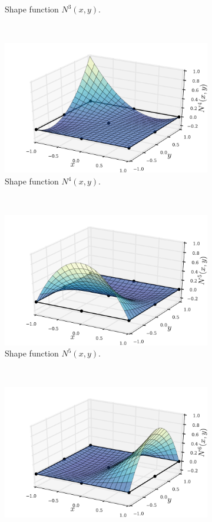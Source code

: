 \begin{figure}[H]
\begin{subfigure}[b]{0.45\textwidth}
		\caption{Shape function $N^3(x,y)$.}
	\end{subfigure}\,
%
	\begin{subfigure}[b]{0.45\textwidth}\qquad
		\includegraphics[width=\textwidth]{shape_func-9-nodes-4.pdf}
		\caption{Shape function $N^4(x,y)$.}
	\end{subfigure}\\
	\begin{subfigure}[b]{0.45\textwidth}\qquad
		\includegraphics[width=\textwidth]{shape_func-9-nodes-5.pdf}
		\caption{Shape function $N^5(x,y)$.}
	\end{subfigure}\,
%
	\begin{subfigure}[b]{0.45\textwidth}\qquad
		\includegraphics[width=\textwidth]{shape_func-9-nodes-6.pdf}

\end{subfigure}
\end{figure}
